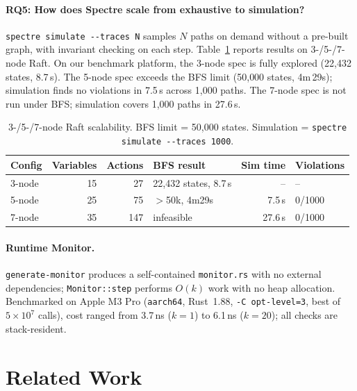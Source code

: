 \documentclass[runningheads]{llncs}
\begin{document}
\paragraph{RQ5: How does Spectre scale from exhaustive to simulation?}

\texttt{spectre simulate -\!\!-traces~N} samples $N$ paths on demand without a
pre-built graph, with invariant checking on each step.
Table~\ref{tab:scaling} reports results on 3-/5-/7-node Raft.
On our benchmark platform, the 3-node spec is fully explored (22{,}432 states, 8.7\,s).
The 5-node spec exceeds the BFS limit (50{,}000 states, 4m\,29s);
simulation finds no violations in 7.5\,s across 1{,}000 paths.
The 7-node spec is not run under BFS; simulation covers 1{,}000 paths in 27.6\,s.

\begin{table}[h]
\caption{3-/5-/7-node Raft scalability.  BFS limit = 50{,}000 states.
  Simulation = \texttt{spectre simulate -\!\!-traces~1000}.}\label{tab:scaling}
\centering
\small
\begin{tabular}{lrrlrl}
\toprule
Config & Variables & Actions & BFS result & Sim time & Violations \\
\midrule
3-node & 15 & 27 & 22{,}432 states, 8.7\,s & -- & -- \\
5-node & 25 & 75 & $>$50k, 4m29s  & 7.5\,s  & 0/1000 \\
7-node & 35 & 147 & infeasible   & 27.6\,s & 0/1000 \\
\bottomrule
\end{tabular}
\end{table}

\paragraph{Runtime Monitor.}
\texttt{generate-monitor} produces a self-contained \texttt{monitor.rs}
with no external dependencies; \texttt{Monitor::step} performs $O(k)$ work
with no heap allocation.
Benchmarked on Apple M3 Pro (\texttt{aarch64}, Rust~1.88, \texttt{-C opt-level=3},
best of $5 \times 10^7$ calls), cost ranged from 3.7\,ns ($k=1$) to
6.1\,ns ($k=20$); all checks are stack-resident.

\section{Related Work}\label{sec:related}
\end{document}
